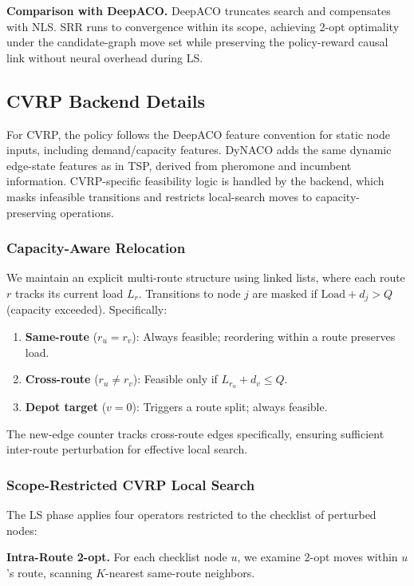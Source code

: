 \documentclass[sigconf,nonacm]{acmart}
\begin{document}
\textbf{Comparison with DeepACO.}
DeepACO truncates search and compensates with NLS.
SRR runs to convergence within its scope, achieving 2-opt optimality under the candidate-graph move set while preserving the policy-reward causal link without neural overhead during LS.

\subsection{CVRP Backend Details}
\label{app:cvrp}

For CVRP, the policy follows the DeepACO feature convention for static node inputs, including demand/capacity features. DyNACO adds the same dynamic edge-state features as in TSP, derived from pheromone and incumbent information. CVRP-specific feasibility logic is handled by the backend, which masks infeasible transitions and restricts local-search moves to capacity-preserving operations.

\subsubsection{Capacity-Aware Relocation}
We maintain an explicit multi-route structure using linked lists, where each route $r$ tracks its current load $L_r$.
Transitions to node $j$ are masked if $\text{Load} + d_j > Q$ (capacity exceeded).
Specifically:
\begin{enumerate}
    \item \textbf{Same-route} ($r_u = r_v$): Always feasible; reordering within a route preserves load.
    \item \textbf{Cross-route} ($r_u \neq r_v$): Feasible only if $L_{r_u} + d_v \leq Q$.
    \item \textbf{Depot target} ($v = 0$): Triggers a route split; always feasible.
\end{enumerate}
The new-edge counter tracks cross-route edges specifically, ensuring sufficient inter-route perturbation for effective local search.

\subsubsection{Scope-Restricted CVRP Local Search}
The LS phase applies four operators restricted to the checklist of perturbed nodes:

\textbf{Intra-Route 2-opt.}
For each checklist node $u$, we examine 2-opt moves within $u$'s route, scanning $K$-nearest same-route neighbors.
\end{document}
